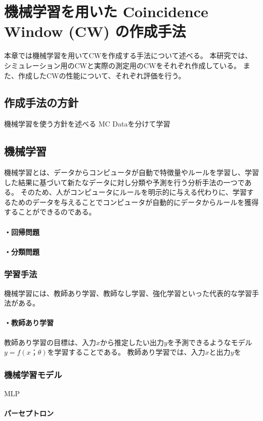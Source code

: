 \chapter{機械学習を用いた Coincidence Window (CW) の作成手法}
本章では機械学習を用いてCWを作成する手法について述べる。
本研究では、シミュレーション用のCWと実際の測定用のCWをそれぞれ作成している。
また、作成したCWの性能について、それぞれ評価を行う。

\section{作成手法の方針}
機械学習を使う方針を述べる
MC Dataを分けて学習\\

\section{機械学習}
機械学習とは、データからコンピュータが自動で特徴量やルールを学習し、学習した結果に基づいて新たなデータに対し分類や予測を行う分析手法の一つである。
そのため、人がコンピュータにルールを明示的に与える代わりに、学習するためのデータを与えることでコンピュータが自動的にデータからルールを獲得することができるのである。
\subsubsection{・回帰問題}
\subsubsection{・分類問題}

\subsection{学習手法}
機械学習には、教師あり学習、教師なし学習、強化学習といった代表的な学習手法がある。
\subsubsection{・教師あり学習}
教師あり学習の目標は、入力$x$から推定したい出力$y$を予測できるようなモデル$y = f(x；\theta)$を学習することである。
教師あり学習では、入力$x$と出力$y$を

\subsection{機械学習モデル}
MLP
\subsubsection{パーセプトロン}
